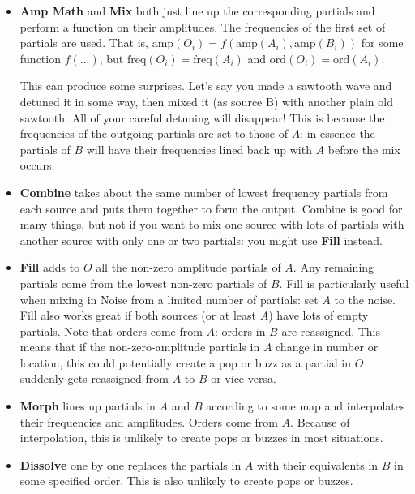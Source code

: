\documentclass{article}
\begin{document}
\begin{itemize}
\item {\bf Amp Math} and {\bf Mix} both just line up the corresponding partials and perform a function on their amplitudes.  The frequencies of the first set of partials are used. That is, \(\text{amp}(O_i) = f(\text{amp}(A_i), \text{amp}(B_i))\) for some function \(f(...)\), but \(\text{freq}(O_i) = \text{freq}(A_i)\) and  \(\text{ord}(O_i) = \text{ord}(A_i)\).  

This can produce some surprises.  Let's say you made a sawtooth wave and detuned it in some way, then mixed it (as source B) with another plain old sawtooth.  All of your careful detuning will disappear!  This is because the frequencies of the outgoing partials are set to those of \(A\): in essence the partials of \(B\) will have their frequencies lined back up with \(A\) before the mix occurs.

\item {\bf Combine} takes about the same number of lowest frequency partials from each source and puts them together to form the output.  Combine is good for many things, but not if you want to mix one source with lots of partials with another source with only one or two partials: you might use {\bf Fill} instead.

\item {\bf Fill} adds to \(O\) all the non-zero amplitude partials of \(A\).  Any remaining partials come from the lowest non-zero partials of \(B\).  Fill is particularly useful when mixing in Noise from a limited number of partials: set \(A\) to the noise.  Fill also works great if both sources (or at least \(A\)) have lots of empty partials.  Note that orders come from \(A\): orders in \(B\) are reassigned.  This means that if the non-zero-amplitude partials in \(A\) change in number or location, this could potentially create a pop or buzz as a partial in \(O\) suddenly gets reassigned from \(A\) to \(B\) or vice versa.

\item {\bf Morph} lines up partials in \(A\) and \(B\) according to some map and interpolates their frequencies and amplitudes.  Orders come from \(A\).  Because of interpolation, this is unlikely to create pops or buzzes in most situations.  

\item {\bf Dissolve} one by one replaces the partials in \(A\) with their equivalents in \(B\) in some specified order.  This is also unlikely to create pops or buzzes.  



\end{itemize}
\end{document}
